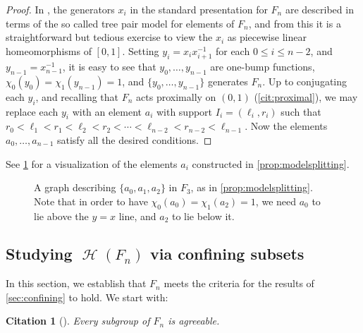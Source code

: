 \documentclass[reqno,12pt]{amsart}\setcounter{tocdepth}{1}
\newtheorem{cit}[theorem]{Citation}
\theoremstyle{definition}
\DeclareMathOperator{\Hyp}{\mathcal{H}}
\numberwithin{equation}{section}
\begin{document}
\begin{proof}
In \cite{burillo01}, the generators $x_i$ in the standard presentation for $F_n$ are described in terms of the so called tree pair model for elements of $F_n$, and from this it is a straightforward but tedious exercise to view the $x_i$ as piecewise linear homeomorphisms of $[0,1]$. Setting $y_i=x_ix_{i+1}^{-1}$ for each $0\le i\le n-2$, and $y_{n-1}=x_{n-1}^{-1}$, it is easy to see that $y_0,\dots,y_{n-1}$ are one-bump functions, $\chi_0(y_0)=\chi_1(y_{n-1})=1$, and $\{y_0,\dots,y_{n-1}\}$ generates $F_n$. Up to conjugating each $y_i$, and recalling that $F_n$ acts proximally on $(0,1)$ (\cref{cit:proximal}), we may replace each $y_i$ with an element $a_i$ with support $I_i = (\ell_i, r_i)$ such that $r_0 < \ell_1 < r_1 < \ell_2 < r_2 < \cdots < \ell_{n-2} < r_{n-2} < \ell_{n-1}$. Now the elements $a_0,\dots,a_{n-1}$ satisfy all the desired conditions.
\end{proof}

See \cref{fig:bumps} for a visualization of the elements $a_i$ constructed in \cref{prop:modelsplitting}.

\begin{figure}[htb]
\centering
{}
\caption{A graph describing $\{ a_0, a_1, a_2 \}$ in $F_3$, as in \cref{prop:modelsplitting}. Note that in order to have $\chi_0(a_0)=\chi_1(a_2)=1$, we need $a_0$ to lie above the $y=x$ line, and $a_2$ to lie below it.}
\label{fig:bumps}
\end{figure}


\subsection{Studying $\Hyp(F_n)$ via confining subsets}

In this section, we establish that $F_n$ meets the criteria for the results of \cref{sec:confining} to hold. We start with:

\begin{cit}[{\cite{calegari:PL, commutingconjugates}}]
\label{cit:F_agreeable}
Every subgroup of $F_n$ is agreeable.
\end{cit}
\end{document}
